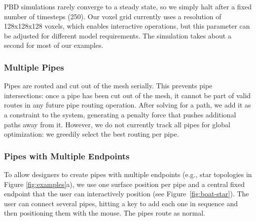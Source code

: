 
PBD simulations rarely converge to a steady state, so we simply halt after a fixed number of timesteps (250). Our voxel grid currently uses a resolution of 128x128x128 voxels, which enables interactive operations, but this parameter can be adjusted for different model requirements. The simulation takes about a second for most of our examples.   

\subsubsection{Multiple Pipes}
Pipes are routed and cut out of the mesh serially. This prevents pipe intersections: once a pipe has been cut out of the mesh, it cannot be part of valid routes in any future pipe routing operation. After solving for a path, we add it as a constraint to the system, generating
a penalty force that pushes additional paths away from it.  However, we do not currently track all pipes for global optimization: we greedily select the best routing per pipe. 

\subsubsection{Pipes with Multiple Endpoints}
To allow designers to create pipes with multiple endpoints (e.g., star topologies in Figure \ref{fig:examples}a), we use one surface position per pipe and a central fixed endpoint that the user can interactively position (see Figure~\ref{fig:boat-star}).  The user can connect several pipes, hitting a key to add each one in sequence and then positioning them with the mouse.  The pipes route as normal.

